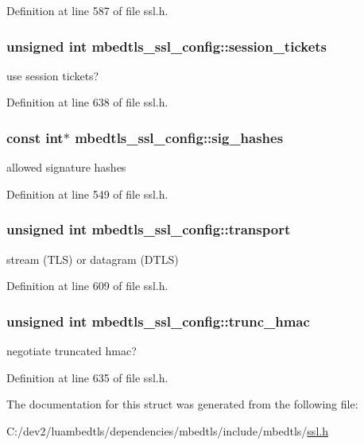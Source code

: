 Definition at line 587 of file ssl.\-h.

\hypertarget{structmbedtls__ssl__config_a1b988bcd1b38c51cb802bf8af5d05c7b}{
\subsubsection[{session\-\_\-tickets}]{\setlength{\rightskip}{0pt plus 5cm}unsigned int mbedtls\-\_\-ssl\-\_\-config\-::session\-\_\-tickets}}\label{structmbedtls__ssl__config_a1b988bcd1b38c51cb802bf8af5d05c7b}
use session tickets? 

Definition at line 638 of file ssl.\-h.

\hypertarget{structmbedtls__ssl__config_a82552e1dd3c9065ef98e2835fc925653}{
\subsubsection[{sig\-\_\-hashes}]{\setlength{\rightskip}{0pt plus 5cm}const int$\ast$ mbedtls\-\_\-ssl\-\_\-config\-::sig\-\_\-hashes}}\label{structmbedtls__ssl__config_a82552e1dd3c9065ef98e2835fc925653}
allowed signature hashes 

Definition at line 549 of file ssl.\-h.

\hypertarget{structmbedtls__ssl__config_a63cafd8d131ac7d162406b47bc6565d0}{
\subsubsection[{transport}]{\setlength{\rightskip}{0pt plus 5cm}unsigned int mbedtls\-\_\-ssl\-\_\-config\-::transport}}\label{structmbedtls__ssl__config_a63cafd8d131ac7d162406b47bc6565d0}
stream (T\-L\-S) or datagram (D\-T\-L\-S) 

Definition at line 609 of file ssl.\-h.

\hypertarget{structmbedtls__ssl__config_a24bf9d624a2e2432518e9da8ae908db4}{
\subsubsection[{trunc\-\_\-hmac}]{\setlength{\rightskip}{0pt plus 5cm}unsigned int mbedtls\-\_\-ssl\-\_\-config\-::trunc\-\_\-hmac}}\label{structmbedtls__ssl__config_a24bf9d624a2e2432518e9da8ae908db4}
negotiate truncated hmac? 

Definition at line 635 of file ssl.\-h.



The documentation for this struct was generated from the following file\-:\begin{DoxyCompactItemize}
\item 
C\-:/dev2/luambedtls/dependencies/mbedtls/include/mbedtls/\hyperlink{ssl_8h}{ssl.\-h}\end{DoxyCompactItemize}
